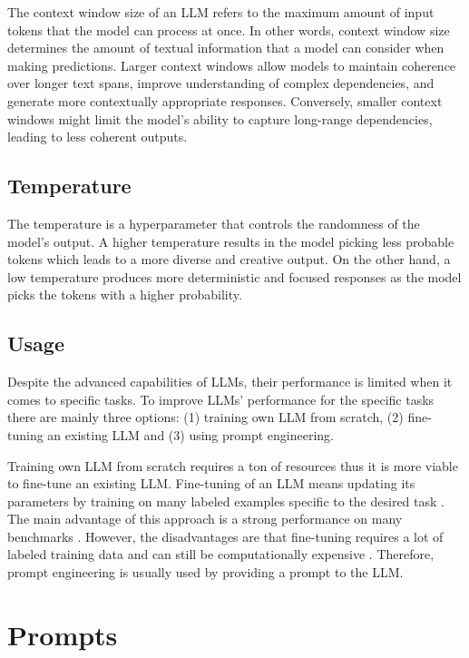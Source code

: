 The context window size of an LLM refers to the maximum amount of input tokens that the model can process at once. In other words, context window size determines the amount of textual information that a model can consider when making predictions. Larger context windows allow models to maintain coherence over longer text spans, improve understanding of complex dependencies, and generate more contextually appropriate responses. Conversely, smaller context windows might limit the model's ability to capture long-range dependencies, leading to less coherent outputs.


\subsection{Temperature}
\label{temperature}

The temperature is a hyperparameter that controls the randomness of the model's output. A higher temperature results in the model picking less probable tokens which leads to a more diverse and creative output. On the other hand, a low temperature produces more deterministic and focused responses as the model picks the tokens with a higher probability.


\subsection{Usage}

Despite the advanced capabilities of LLMs, their performance is limited when it comes to specific tasks. To improve LLMs' performance for the specific tasks there are mainly three options: (1) training own LLM from scratch, (2) fine-tuning an existing LLM and (3) using prompt engineering.

Training own LLM from scratch requires a ton of resources \cite{Zhao2023} thus it is more viable to fine-tune an existing LLM. Fine-tuning of an LLM means updating its parameters by training on many labeled examples specific to the desired task \cite{Brown2020}. The main advantage of this approach is a strong performance on many benchmarks \cite{Brown2020}. However, the disadvantages are that fine-tuning requires a lot of labeled training data and can still be computationally expensive \cite{Brown2020}. Therefore, prompt engineering is usually used by providing a prompt to the LLM.


\section{Prompts}

